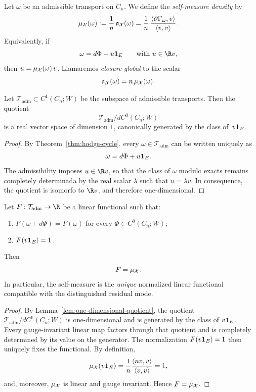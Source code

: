 \begin{definition}
Let $\omega$ be an admissible transport on $C_n$. We define the
\emph{self-measure density} by
\[
\mu_\mathcal X(\omega):=\frac{1}{n}\,\mathfrak a_\mathcal X(\omega)
=\frac{1}{n}\,\frac{\langle \partial\Gamma_\omega,v\rangle}{\langle v,v\rangle}.
\]
Equivalently, if
\[
\omega=d\Phi+u\oneE
\qquad\text{with }u\in\R v,
\]
then $u=\mu_\mathcal X(\omega)\,v$.
Llamaremos \emph{closure global} to the scalar
\[
\mathfrak a_\mathcal X(\omega)=n\,\mu_\mathcal X(\omega).
\]
\end{definition}

\begin{lemma}\label{lem:one-dimensional-quotient}
Let $\mathcal T_{\mathrm{adm}}\subset C^1(C_n;W)$ be the subspace of admissible transports. Then
the quotient
\[
\mathcal T_{\mathrm{adm}}/dC^0(C_n;W)
\]
is a real vector space of dimension $1$, canonically generated by the class of
$\,v\mathbf 1_E$.
\end{lemma}

\begin{proof}
By Theorem~\ref{thm:hodge-cycle}, every $\omega\in\mathcal T_{\mathrm{adm}}$ can be written uniquely
as
\[
\omega=d\Phi+u\mathbf 1_E.
\]
The admissibility imposes $u\in\R v$, so that the class of $\omega$ modulo exacts remains
completely determinada by the real scalar $\lambda$ such that $u=\lambda v$. In consequence,
the quotient is isomorfo to $\R v$, and therefore one-dimensional.
\end{proof}

\begin{theorem}\label{thm:uniqueness-self-measurement}
Let $F:\mathcal T_{\mathrm{adm}}\to\R$ be a linear functional such that:
\begin{enumerate}[label=\textup{(\roman*)}]
\item $F(\omega+d\Phi)=F(\omega)$ for every $\Phi\in C^0(C_n;W)$;
\item $F(v\mathbf 1_E)=1$.
\end{enumerate}
Then
\[
F=\mu_\mathcal X.
\]
In particular, the self-measure is the
\emph{unique} normalized linear functional
compatible with the distinguished residual mode.
\end{theorem}

\begin{proof}
By Lemma~\ref{lem:one-dimensional-quotient}, the quotient
$\mathcal T_{\mathrm{adm}}/dC^0(C_n;W)$ is one-dimensional and is generated by the class of
$v\mathbf 1_E$. Every gauge-invariant linear map factors through that quotient and is
completely determined by its value on the generator. The normalization
$F(v\mathbf 1_E)=1$ then uniquely fixes the functional. By definition,
\[
\mu_\mathcal X(v\mathbf 1_E)=\frac1n\frac{\langle nv,v\rangle}{\langle v,v\rangle}=1,
\]
and, moreover, $\mu_\mathcal X$ is linear and gauge invariant. Hence $F=\mu_\mathcal X$.
\end{proof}

